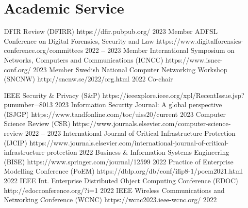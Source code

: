 
\section{Academic Service}
    
    
        
        \titleLinkYearRolePlace
            {DFIR Review (DFIRR)}
            {https://dfir.pubpub.org/}
            {2023}
            {Member}
            {}
        \titleLinkYearRolePlace
            {ADFSL Conference on Digital Forensics, Security and Law}
            {https://www.digitalforensics-conference.org/committees}
            {2022 \textbf{--} 2023}
            {Member}
            {}
        \titleLinkYearRolePlace
            {International Symposium on Networks, Computers and Communications (ICNCC)}
            {https://www.isncc-conf.org/}
            {2023}
            {Member}
            {}
        \titleLinkYearRolePlace
            {Swedish National Computer Networking Workshop (SNCNW)}
            {http://sncnw.se/2022/org.html}
            {2022}
            {Co-chair}
            {}
    
    \itemizeCVEnd

    
        
        \titleLinkYearRolePlace
            {IEEE Security \& Privacy (S\&P)}
            {https://ieeexplore.ieee.org/xpl/RecentIssue.jsp?punumber=8013}
            {2023}
            {}
            {}
        \titleLinkYearRolePlace
            {Information Security Journal: A global perspective (ISJGP)}
            {https://www.tandfonline.com/toc/uiss20/current}
            {2023}
            {}
            {}
        \titleLinkYearRolePlace
            {Computer Science Review (CSR)}
            {https://www.journals.elsevier.com/computer-science-review}
            {2022 \textbf{--} 2023}
            {}
            {}
        \titleLinkYearRolePlace
            {International Journal of Critical Infrastructure Protection (IJCIP)}
            {https://www.journals.elsevier.com/international-journal-of-critical-infrastructure-protection}
            {2022}
            {}
            {}
        \titleLinkYearRolePlace
            {Business \& Information Systems Engineering (BISE)}
            {https://www.springer.com/journal/12599}
            {2022}
            {}
            {}
        \titleLinkYearRolePlace
            {Practice of Enterprise Modelling Conference (PoEM)}
            {https://dblp.org/db/conf/ifip8-1/poem2021.html}
            {2022}
            {}
            {}
        \titleLinkYearRolePlace
            {IEEE Int. Enterprise Distributed Object Computing Conference (EDOC)}
            {http://edocconference.org/?i=1}
            {2022}
            {}
            {}
        \titleLinkYearRolePlace
            {IEEE Wireless Communications and Networking Conference (WCNC)}
            {https://wcnc2023.ieee-wcnc.org/}
            {2022}
            {}
            {}
        
